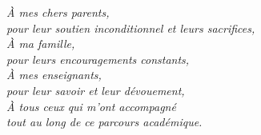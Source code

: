 ﻿%
\thispagestyle{empty}
\vspace*{5cm}
\begin{center}
\Large\itshape\color{darkblue}
À mes chers parents,\\[0.4cm]
pour leur soutien inconditionnel et leurs sacrifices,\\[0.8cm]
À ma famille,\\[0.4cm]
pour leurs encouragements constants,\\[0.8cm]
À mes enseignants,\\[0.4cm]
pour leur savoir et leur dévouement,\\[0.8cm]
À tous ceux qui m'ont accompagné\\[0.4cm]
tout au long de ce parcours académique.
\end{center}
\vfill
\clearpage
